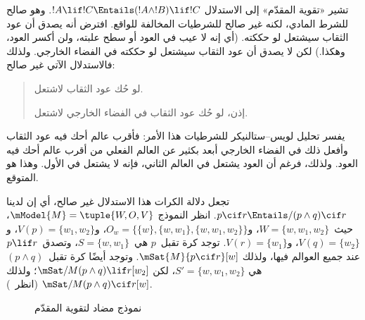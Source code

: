 \documentclass[../../../include/open-logic-section]{subfiles}
\begin{document}


تشير «تقوية المقدّم» إلى الاستدلال
$!A \lif !C \Entails (!A \land !B) \lif !C$. وهو صالح للشرط المادي،
لكنه غير صالح للشرطيات المخالفة للواقع. افترض أنه يصدق أن عود الثقاب
سيشتعل لو حككته. (أي إنه لا عيب في العود أو سطح علبته، ولن أكسر العود،
وهكذا.) لكن لا يصدق أن عود الثقاب سيشتعل لو حككته في الفضاء الخارجي.
ولذلك فالاستدلال الآتي غير صالح:
\begin{quote}
  لو حُك عود الثقاب لاشتعل.

  إذن، لو حُك عود الثقاب في الفضاء الخارجي لاشتعل.
\end{quote}

يفسر تحليل لويس--ستالنيكر للشرطيات هذا الأمر: فأقرب عالم أحك فيه عود
الثقاب وأفعل ذلك في الفضاء الخارجي أبعد بكثير عن العالم الفعلي من أقرب
عالم أحك فيه العود. ولذلك، فرغم أن العود يشتعل في العالم الثاني، فإنه
لا يشتعل في الأول. وهذا هو المتوقع.

\begin{ex}
  تجعل دلالة الكرات هذا الاستدلال غير صالح، أي إن لدينا
  $p \cif r \Entails/ (p \land q) \cif r$. انظر النموذج
  $\mModel{M} = \tuple{W, O, V}$، حيث~$W = \{w, w_1, w_2\}$،
  و$O_w = \{\{w\}, \{w, w_1\}, \{w, w_1, w_2\}\}$،
  و$V(p) = \{w_1, w_2\}$، و$V(q) = \{w_2\}$،
  و$V(r) = \{w_1\}$. توجد كرة تقبل~$p$ هي~$S = \{w, w_1\}$،
  وتصدق~$p \lif r$ عند جميع العوالم فيها، ولذلك
  $\mSat{M}{p \cif r}[w]$. وتوجد أيضًا كرة تقبل~$(p \land q)$ هي
  $S' = \{w, w_1, w_2\}$، لكن
  $\mSat/{M}{(p \land q) \lif r}[w_2]$؛ ولذلك
  $\mSat/{M}{(p \land q) \cif r}[w]$
  (انظر~).

\begin{figure}
\begin{center}
\caption{نموذج مضاد لتقوية المقدّم}
\end{center}
\end{figure}
\end{ex}
\end{document}
